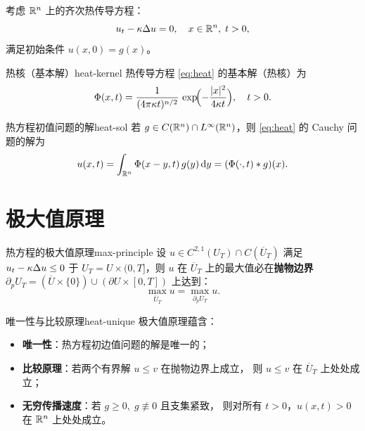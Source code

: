 \documentclass[11pt,a4paper,openany,oneside]{ctexbook}
\begin{document}
考虑 $\mathbb{R}^{n}$ 上的齐次热传导方程：
\begin{equation}\label{eq:heat}
  u_{t} - \kappa\Delta u = 0,\quad x\in\mathbb{R}^{n},\; t>0,
\end{equation}
满足初始条件 $u(x,0)=g(x)$。

\begin{definition}{热核（基本解）}{heat-kernel}
  热传导方程 \eqref{eq:heat} 的基本解（热核）为
  $$
  \Phi(x,t) = \frac{1}{(4\pi\kappa t)^{n/2}}\,
              \exp\!\Bigl(-\frac{|x|^{2}}{4\kappa t}\Bigr),\quad t>0.
  $$
\end{definition}

\begin{theorem}{热方程初值问题的解}{heat-sol}
  若 $g\in C(\mathbb{R}^{n})\cap L^{\infty}(\mathbb{R}^{n})$，则 \eqref{eq:heat} 的 Cauchy 问题的解为
  \begin{equation}\label{eq:heat-conv}
    u(x,t) = \int_{\mathbb{R}^{n}} \Phi(x-y,t)\,g(y)\,\mathrm{d} y
           = (\Phi(\cdot,t) * g)(x).
  \end{equation}
\end{theorem}

\section{极大值原理}

\begin{theorem}{热方程的极大值原理}{max-principle}
  设 $u\in C^{2,1}(U_{T})\cap C(\overline{U}_{T})$ 满足 $u_{t}-\kappa\Delta u\le 0$
  于 $U_{T}=U\times(0,T]$，则 $u$ 在 $\overline{U}_{T}$ 上的最大值必在\textbf{抛物边界}
  $\partial_{p}U_{T}=(\overline{U}\times\{0\})\cup(\partial U\times[0,T])$ 上达到：
  $$
  \max_{\overline{U}_{T}} u = \max_{\partial_{p}U_{T}} u.
  $$
\end{theorem}

\begin{corollary}{唯一性与比较原理}{heat-unique}
  极大值原理蕴含：
  \begin{itemize}
    \item \textbf{唯一性}：热方程初边值问题的解是唯一的；
    \item \textbf{比较原理}：若两个有界解 $u\le v$ 在抛物边界上成立，
          则 $u\le v$ 在 $\overline{U}_{T}$ 上处处成立；
    \item \textbf{无穷传播速度}：若 $g\ge 0,\;g\not\equiv 0$ 且支集紧致，
          则对所有 $t>0$，$u(x,t)>0$ 在 $\mathbb{R}^{n}$ 上处处成立。
  \end{itemize}
\end{corollary}
\end{document}
